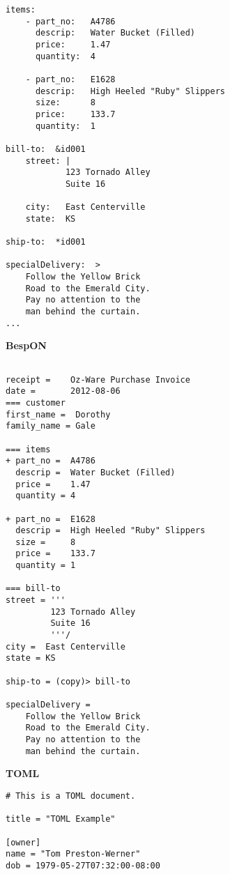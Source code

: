 \documentclass[11pt]{article}
\begin{document}
\begin{appendices}
\begin{tcolorbox}{}
\begin{multicols}{2}
\begin{Verbatim}[formatcom=\color{DarkGreen}]
items:
    - part_no:   A4786
      descrip:   Water Bucket (Filled)
      price:     1.47
      quantity:  4

    - part_no:   E1628
      descrip:   High Heeled "Ruby" Slippers
      size:      8
      price:     133.7
      quantity:  1

bill-to:  &id001
    street: |
            123 Tornado Alley
            Suite 16
    
    city:   East Centerville
    state:  KS

ship-to:  *id001

specialDelivery:  >
    Follow the Yellow Brick
    Road to the Emerald City.
    Pay no attention to the
    man behind the curtain.
...
\end{Verbatim}
\columnbreak
\centering \textbf{BespON}

\begin{Verbatim}

receipt =    Oz-Ware Purchase Invoice
date =       2012-08-06
=== customer
first_name =  Dorothy
family_name = Gale

=== items
+ part_no =  A4786
  descrip =  Water Bucket (Filled)
  price =    1.47
  quantity = 4

+ part_no =  E1628
  descrip =  High Heeled "Ruby" Slippers
  size =     8
  price =    133.7
  quantity = 1

=== bill-to
street = '''
         123 Tornado Alley
         Suite 16
         '''/
city =  East Centerville
state = KS

ship-to = (copy)> bill-to

specialDelivery =
    Follow the Yellow Brick
    Road to the Emerald City.
    Pay no attention to the
    man behind the curtain.

\end{Verbatim}
\end{multicols}
\end{tcolorbox}




\begin{tcolorbox}{}
\begin{multicols}{2}

\centering \textbf{TOML}
\begin{Verbatim}[formatcom=\color{DarkGreen}]
# This is a TOML document.

title = "TOML Example"

[owner]
name = "Tom Preston-Werner"
dob = 1979-05-27T07:32:00-08:00


\end{Verbatim}
\end{multicols}
\end{tcolorbox}
\end{appendices}
\end{document}
